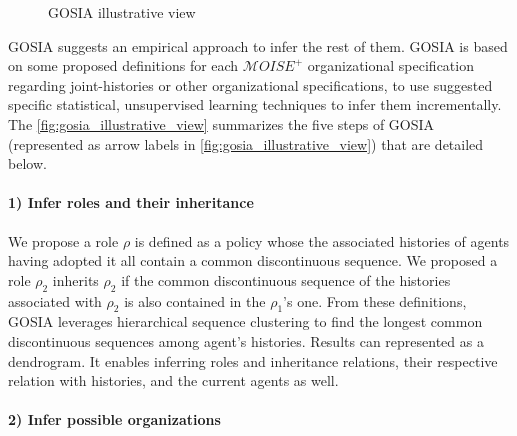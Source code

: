 \documentclass[sn-mathphys-num]{sn-jnl}%
\theoremstyle{thmstyleone}%
\theoremstyle{thmstyletwo}%
\theoremstyle{thmstylethree}%
\begin{document}

\begin{figure*}[h!]
    \centering
    
    \caption{GOSIA illustrative view}
    \label{fig:gosia_illustrative_view}
\end{figure*}

GOSIA suggests an empirical approach to infer the rest of them.
GOSIA is based on some proposed definitions for each $\mathcal{M}OISE^+$ organizational specification regarding joint-histories or other organizational specifications, to use suggested specific statistical, unsupervised learning techniques to infer them incrementally. The \autoref{fig:gosia_illustrative_view} summarizes the five steps of GOSIA (represented as arrow labels in \autoref{fig:gosia_illustrative_view}) that are detailed below.
%
\paragraph{1) Infer roles and their inheritance}

We propose a role $\rho$ is defined as a policy whose the associated histories of agents having adopted it all contain a common discontinuous sequence. We proposed a role $\rho_2$ inherits $\rho_2$ if the common discontinuous sequence of the histories associated with $\rho_2$ is also contained in the $\rho_1$'s one.
From these definitions, GOSIA leverages hierarchical sequence clustering to find the longest common discontinuous sequences among agent's histories. Results can represented as a dendrogram. It enables inferring roles and inheritance relations, their respective relation with histories, and the current agents as well.

\paragraph{2) Infer possible organizations}
\end{document}
